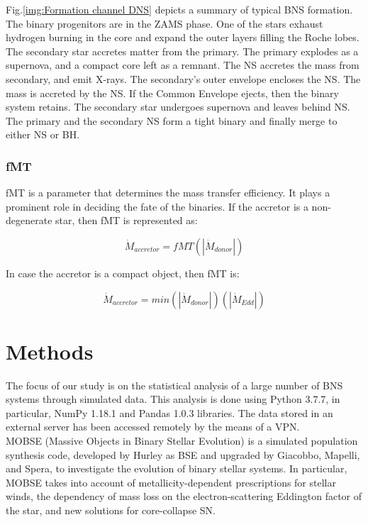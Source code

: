 \documentclass[preprint,12pt]{elsarticle}
\begin{document}
Fig.\ref{img:Formation channel DNS} depicts a summary of typical BNS formation. The binary progenitors are in the ZAMS phase. One of the stars exhaust hydrogen burning in the core and expand the outer layers filling the Roche lobes. The secondary star accretes matter from the primary. The primary explodes as a supernova, and a compact core left as a remnant. The NS accretes the mass from secondary, and emit X-rays. The secondary's outer envelope encloses the NS. The mass is accreted by the NS. If the Common Envelope ejects, then the binary system retains. The secondary star undergoes supernova and leaves behind NS. The primary and the secondary NS form a tight binary and finally merge to either NS or BH.


\subsubsection{\textbf{fMT}}
fMT is a parameter that determines the mass transfer efficiency. It plays a prominent role in deciding the fate of the binaries. If the accretor is a non-degenerate star, then fMT is represented as:

\begin{equation}
  \Dot{M}_{accretor}=fMT(|\Dot{M}_{donor}|)
\end{equation}

In case the accretor is a compact object, then fMT is:

\begin{equation}
  \Dot{M}_{accretor}= min(|\Dot{M}_{donor}|)(|\Dot{M}_{Edd}|)
\end{equation}


\section{Methods}

The focus of our study is on the statistical analysis of a large number of BNS systems through simulated data. This analysis is done using Python 3.7.7, in particular, NumPy 1.18.1 and Pandas 1.0.3 libraries. The data stored in an external server has been accessed remotely by the means of a VPN.\\

MOBSE (Massive Objects in Binary Stellar Evolution) is a simulated population synthesis code, developed by Hurley as BSE\citep{Hurley:2002} and upgraded by Giacobbo, Mapelli, and Spera\citep{Giacobbo:2017}, to investigate the evolution of binary stellar systems. In particular, MOBSE takes into account of metallicity-dependent prescriptions for stellar winds, the dependency of mass loss on the electron-scattering Eddington factor of the star, and new solutions for core-collapse SN. \\
\end{document}
